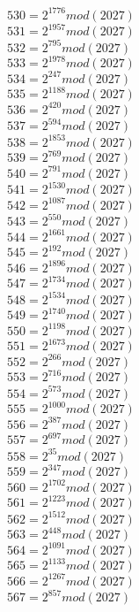 \documentclass[12pt, letterpaper]{article}
\begin{document}
\begin{itemize}
\begin{multicols}{3}
$530= 2^{1776} mod (2027)$\\
$531= 2^{1957} mod (2027)$\\
$532= 2^{795} mod (2027)$\\
$533= 2^{1978} mod (2027)$\\
$534= 2^{247} mod (2027)$\\
$535= 2^{1188} mod (2027)$\\
$536= 2^{420} mod (2027)$\\
$537= 2^{594} mod (2027)$\\
$538= 2^{1853} mod (2027)$\\
$539= 2^{769} mod (2027)$\\
$540= 2^{791} mod (2027)$\\
$541= 2^{1530} mod (2027)$\\
$542= 2^{1087} mod (2027)$\\
$543= 2^{550} mod (2027)$\\
$544= 2^{1661} mod (2027)$\\
$545= 2^{192} mod (2027)$\\
$546= 2^{1896} mod (2027)$\\
$547= 2^{1734} mod (2027)$\\
$548= 2^{1534} mod (2027)$\\
$549= 2^{1740} mod (2027)$\\
$550= 2^{1198} mod (2027)$\\
$551= 2^{1673} mod (2027)$\\
$552= 2^{266} mod (2027)$\\
$553= 2^{716} mod (2027)$\\
$554= 2^{573} mod (2027)$\\
$555= 2^{1000} mod (2027)$\\
$556= 2^{387} mod (2027)$\\
$557= 2^{697} mod (2027)$\\
$558= 2^{35} mod (2027)$\\
$559= 2^{347} mod (2027)$\\
$560= 2^{1702} mod (2027)$\\
$561= 2^{1223} mod (2027)$\\
$562= 2^{1512} mod (2027)$\\
$563= 2^{448} mod (2027)$\\
$564= 2^{1091} mod (2027)$\\
$565= 2^{1133} mod (2027)$\\
$566= 2^{1267} mod (2027)$\\
$567= 2^{857} mod (2027)$\\

\end{multicols}
\end{itemize}
\end{document}
